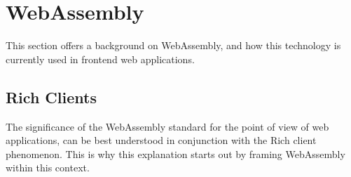 






\newpage

\section{WebAssembly}
\label{sec:background-web}

This section offers a background on WebAssembly, and how this technology is currently used in frontend web applications.

\subsection{Rich Clients}
\label{sec:background-web-rich}

The significance of the WebAssembly standard for the point of view of web applications, can be best understood in conjunction with the Rich client phenomenon. 
This is why this explanation starts out by framing WebAssembly within this context.

